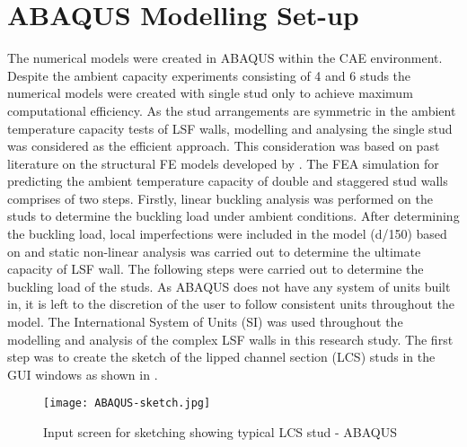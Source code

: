 \section{ABAQUS Modelling Set-up}

The numerical models were created in ABAQUS within the CAE environment. Despite the ambient capacity experiments consisting of 4 and 6 studs the numerical models were created with single stud only to achieve maximum computational efficiency. As the stud arrangements are symmetric in the ambient temperature capacity tests of LSF walls, modelling and analysing the single stud was considered as the efficient approach. This consideration was based on past literature on the structural FE models developed by \citet{Shahbazian2011,Gunalan2013f,Kesawan2016a,Ariyanayagam2019}. The FEA simulation for predicting the ambient temperature capacity of double and staggered stud walls comprises of two steps. Firstly, linear buckling analysis was performed on the studs to determine the buckling load under ambient conditions. After determining the buckling load, local imperfections were included in the model (d/150) based on \citet{Gunalan2013f} and static non-linear analysis was carried out to determine the ultimate capacity of LSF wall. The following steps were carried out to determine the buckling load of the studs. As ABAQUS does not have any system of units built in, it is left to the discretion of the user to follow consistent units throughout the model. The International System of Units (SI) was used throughout the modelling and analysis of the complex LSF walls in this research study. The first step was to create the sketch of the lipped channel section (LCS) studs in the GUI windows as shown in .
\begin{figure}[!htbp]
	\centering
			\texttt{[image: ABAQUS-sketch.jpg]}\\
		\caption{Input screen for sketching showing typical LCS stud - ABAQUS }
		\label{fig:ABAQUS-sketch}
\end{figure}

